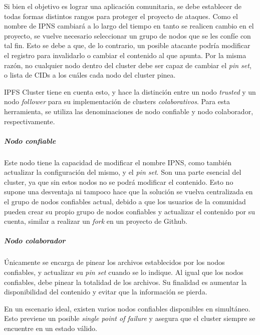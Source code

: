Si bien el objetivo es lograr una aplicación comunitaria, se debe establecer de todas formas distintos rangos para proteger el proyecto de ataques. Como el nombre de IPNS cambiará a lo largo del tiempo en tanto se realicen cambio en el proyecto, se vuelve necesario seleccionar un grupo de nodos que se les confíe con tal fin. Esto se debe a que, de lo contrario, un posible atacante podría modificar el registro para invalidarlo o cambiar el contenido al que apunta. Por la misma razón, no cualquier nodo dentro del cluster debe ser capaz de cambiar el \textit{pin set}, o lista de CIDs a los cuáles cada nodo del cluster pinea.

IPFS Cluster tiene en cuenta esto, y hace la distinción entre un nodo \textit{trusted} y un nodo \textit{follower} para su implementación de clusters \textit{colaborativos}\cite{ipfs-cluster-collaborative}. Para esta herramienta, se utiliza las denominaciones de nodo confiable y nodo colaborador, respectivamente.

\subparagraph{Nodo confiable} Este nodo tiene la capacidad de modificar el nombre IPNS, como también actualizar la configuración del mismo, y el \textit{pin set}. Son una parte esencial del cluster, ya que sin estos nodos no se podrá modificar el contenido. Esto no supone una desventaja ni tampoco hace que la solución se vuelva centralizada en el grupo de nodos confiables actual, debido a que los usuarios de la comunidad pueden crear su propio grupo de nodos confiables y actualizar el contenido por su cuenta, similar a realizar un \textit{fork} en un proyecto de Github.

\subparagraph{Nodo colaborador} Únicamente se encarga de pinear los archivos establecidos por los nodos confiables, y actualizar su \textit{pin set} cuando se lo indique. Al igual que los nodos confiables, debe pinear la totalidad de los archivos. Su finalidad es aumentar la disponibilidad del contenido y evitar que la información se pierda.

En un escenario ideal, existen varios nodos confiables disponibles en simultáneo. Esto previene un posible \textit{single point of failure} y asegura que el cluster siempre se encuentre en un estado válido.

